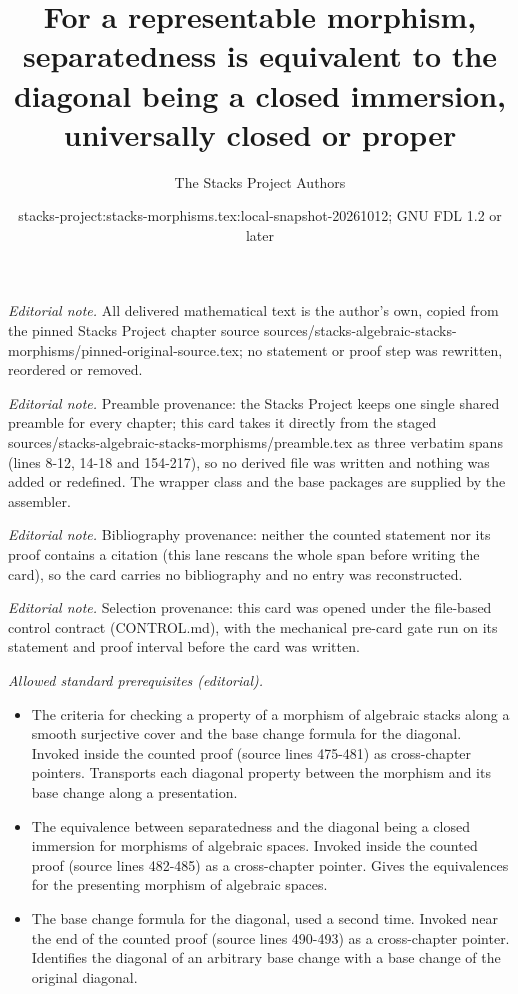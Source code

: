 \documentclass[10pt,a4paper]{amsart}
\title{For a representable morphism, separatedness is equivalent to the diagonal being a closed immersion, universally closed or proper}
\author{The Stacks Project Authors}
\date{stacks-project:stacks-morphisms.tex:local-snapshot-20261012; GNU FDL 1.2 or later}
\theoremstyle{plain}
\theoremstyle{definition}
\theoremstyle{remark}
\numberwithin{equation}{subsection}
\begin{document}
\maketitle
\noindent\textit{Editorial note.} All delivered mathematical text is the author's own, copied from the pinned Stacks Project chapter source sources/stacks-algebraic-stacks-morphisms/pinned-original-source.tex; no statement or proof step was rewritten, reordered or removed.\par\medskip
\noindent\textit{Editorial note.} Preamble provenance: the Stacks Project keeps one single shared preamble for every chapter; this card takes it directly from the staged sources/stacks-algebraic-stacks-morphisms/preamble.tex as three verbatim spans (lines 8-12, 14-18 and 154-217), so no derived file was written and nothing was added or redefined. The wrapper class and the base packages are supplied by the assembler.\par\medskip
\noindent\textit{Editorial note.} Bibliography provenance: neither the counted statement nor its proof contains a citation (this lane rescans the whole span before writing the card), so the card carries no bibliography and no entry was reconstructed.\par\medskip
\noindent\textit{Editorial note.} Selection provenance: this card was opened under the file-based control contract (CONTROL.md), with the mechanical pre-card gate run on its statement and proof interval before the card was written.\par\medskip
\noindent\textit{Allowed standard prerequisites (editorial).}\begin{itemize}
\item The criteria for checking a property of a morphism of algebraic stacks along a smooth surjective cover and the base change formula for the diagonal. Invoked inside the counted proof (source lines 475-481) as cross-chapter pointers. Transports each diagonal property between the morphism and its base change along a presentation.
\item The equivalence between separatedness and the diagonal being a closed immersion for morphisms of algebraic spaces. Invoked inside the counted proof (source lines 482-485) as a cross-chapter pointer. Gives the equivalences for the presenting morphism of algebraic spaces.
\item The base change formula for the diagonal, used a second time. Invoked near the end of the counted proof (source lines 490-493) as a cross-chapter pointer. Identifies the diagonal of an arbitrary base change with a base change of the original diagonal.
\end{itemize}\medskip
\end{document}
